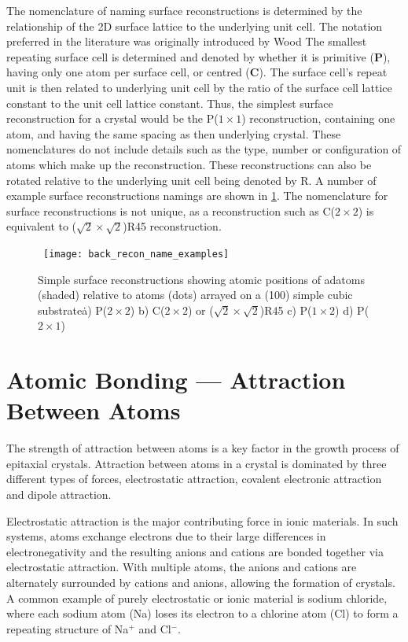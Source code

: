 The nomenclature of naming surface reconstructions is determined by the relationship of the 2D surface lattice to the underlying unit cell. The notation preferred in the literature was originally introduced by Wood\cite{Wood1964} The smallest repeating surface cell is determined and denoted by whether it is primitive (\textbf{P}), having only one atom per surface cell, or centred (\textbf{C}). The surface cell's repeat unit is then related to underlying unit cell by the ratio of the surface cell lattice constant to the unit cell lattice constant. Thus, the simplest surface reconstruction for a crystal would be the P($1 \times 1$) reconstruction, containing one atom, and having the same spacing as then underlying crystal. These nomenclatures do not include details such as the type, number or configuration of atoms which make up the reconstruction. These reconstructions can also be rotated relative to the underlying unit cell being denoted by R. A number of example surface reconstructions namings are shown in \cref{fig:back_recon_name_examples}. The nomenclature for surface reconstructions is not unique, as a reconstruction such as C($2\times2$) is equivalent to ($\sqrt{2}\times\sqrt{2}$)R45\degree{} reconstruction.
\begin{figure}
    \centering\
    \texttt{[image: back\_recon\_name\_examples]}
    \caption[Examples of surface reconstructions]{\label{fig:back_recon_name_examples}Simple surface reconstructions showing atomic positions of adatoms (shaded) relative to atoms (dots) arrayed on a (100) simple cubic substrate\. a) P($2 \times 2$) b) C($2 \times 2$) or ($\sqrt{2}\times\sqrt{2}$)R45\degree{} c) P($1 \times 2$) d) P($2 \times 1$)}
\end{figure}

\section{Atomic Bonding --- Attraction Between Atoms}
The strength of attraction between atoms is a key factor in the growth process of epitaxial crystals. Attraction between atoms in a crystal is dominated by three different types of forces, electrostatic attraction, covalent electronic attraction and dipole attraction.

Electrostatic attraction is the major contributing force in ionic materials. In such systems, atoms exchange electrons due to their large differences in electronegativity and the resulting anions and cations are bonded together via electrostatic attraction. With multiple atoms, the anions and cations are alternately surrounded by cations and anions, allowing the formation of crystals. A common example of purely electrostatic or ionic material is sodium chloride, where each sodium atom (Na) loses its electron to a chlorine atom (Cl) to form a repeating structure of Na$^+$ and Cl$^-$.

